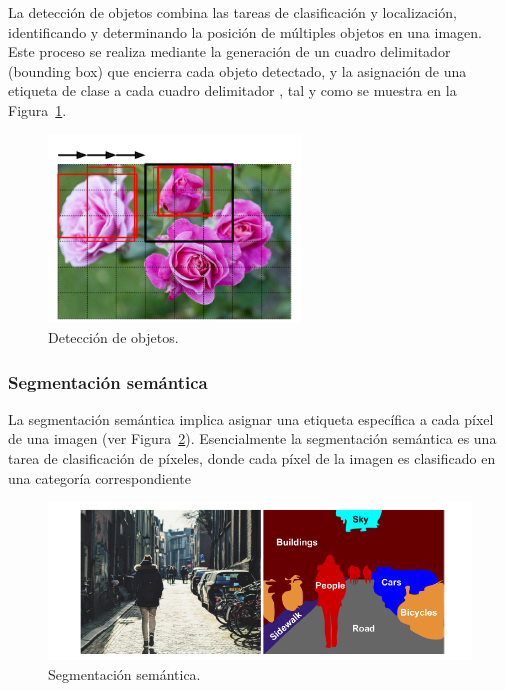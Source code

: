 La detección de objetos combina las tareas de clasificación y localización, identificando y determinando la posición de múltiples objetos en una imagen. Este proceso se realiza mediante la generación de un cuadro delimitador (bounding box) que encierra cada objeto detectado, y la asignación de una etiqueta de clase a cada cuadro delimitador \cite{geron2019hands}, tal y como se muestra en la Figura~\ref{fig:object_detection}.

\begin{figure}[H]
    \begin{center}
        \includegraphics[width=0.6\textwidth]{Images/object_detection.png}
    \end{center}
    \caption{Detección de objetos.}
    \label{fig:object_detection}
\end{figure}

\subsubsection{Segmentación semántica}

La segmentación semántica implica asignar una etiqueta específica a cada píxel de una imagen (ver Figura~\ref{fig:semantic_segmentation}). Esencialmente la segmentación semántica es una tarea de clasificación de píxeles, donde cada píxel de la imagen es clasificado en una categoría correspondiente \cite{patterson2017deep}

\begin{figure}[H]
    \begin{center}
        \includegraphics[width=1\textwidth]{Images/semantic_segmentation.png}
    \end{center}
    \caption{Segmentación semántica.}
    \label{fig:semantic_segmentation}
\end{figure}


